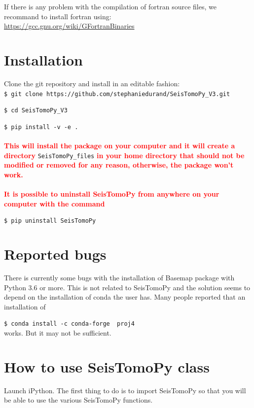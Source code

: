 \documentclass[12pt]{article}
\begin{document}
\noindent If there is any problem with the compilation of fortran source files, we recommand to install fortran using:\\
\url{https://gcc.gnu.org/wiki/GFortranBinaries}

\section{Installation}

Clone the git repository and install in an editable fashion:\\

\verb?$ git clone https://github.com/stephaniedurand/SeisTomoPy_V3.git?

\verb?$ cd SeisTomoPy_V3?

\verb?$ pip install -v -e .?
\\
\\
\noindent   \textcolor{red}{\textbf{This will install the package on your computer and it will create a directory}} \verb?SeisTomoPy_files? \textcolor{red}{\textbf{in your home directory that should not be modified or removed for any reason, otherwise, the package won't work.}} \\
\\
  \textcolor{red}{\textbf{It is possible to uninstall SeisTomoPy from anywhere on your computer with the command}}

\verb?$ pip uninstall SeisTomoPy?

\section{Reported bugs}

There is currently some bugs with the installation of Basemap package with Python 3.6 or more. This is not related to SeisTomoPy and the solution seems to depend on the installation of conda the user has. Many people reported that an installation of 

\verb?$ conda install -c conda-forge  proj4?\\
works. But it may not be sufficient.

  \section{How to use SeisTomoPy class}\label{how-to-use-SeisTomoPy-class }\label{important-starting-notes} 

Launch iPython. The first thing to do is to import SeisTomoPy so that you will
be able to use the various SeisTomoPy functions. 
\end{document}
